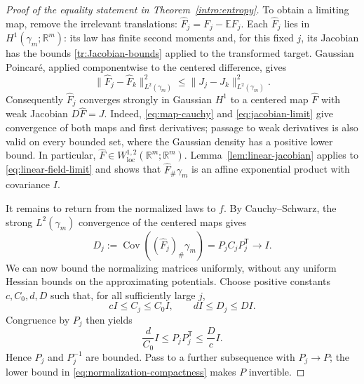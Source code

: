 \documentclass[11pt]{article}
\theoremstyle{definition}
\theoremstyle{remark}
\numberwithin{equation}{section}
\begin{document}
\begin{proof}[Proof of the equality statement in Theorem~\ref{intro:entropy}]
To obtain a limiting map, remove the irrelevant translations:
$\widehat F_j=F_j-\mathbb E F_j$.  Each $\widehat F_j$ lies in
$H^1(\gamma_m;\mathbb R^m)$: its law has finite second moments and, for this
fixed $j$, its Jacobian has the bounds \eqref{tr:Jacobian-bounds}
applied to the transformed target.  Gaussian Poincar\'e, applied
componentwise to the centered difference, gives
\begin{equation}\label{eq:map-cauchy}
  \lVert \widehat F_j-\widehat F_k\rVert_{L^2(\gamma_m)}^2
    \le \lVert J_j-J_k\rVert_{L^2(\gamma_m)}^2.
\end{equation}
Consequently $\widehat F_j$ converges strongly in Gaussian $H^1$ to a
centered map $\widehat F$ with weak Jacobian $D\widehat F=J$.
Indeed, \eqref{eq:map-cauchy} and \eqref{eq:jacobian-limit} give
convergence of both maps and first derivatives; passage to weak
derivatives is also valid on every bounded set, where the Gaussian
density has a positive lower bound.  In particular,
$\widehat F\in W^{1,2}_{\mathrm{loc}}(\mathbb R^m;\mathbb R^m)$.
Lemma~\ref{lem:linear-jacobian} applies to \eqref{eq:linear-field-limit}
and shows that $\widehat F_\#\gamma_m$ is an affine exponential product
with covariance $I$.

It remains to return from the normalized laws to $f$.
By Cauchy--Schwarz, the strong $L^2(\gamma_m)$ convergence of the
centered maps gives
\begin{equation}\label{eq:normalized-covariance-limit}
  D_j:=\operatorname{Cov}((\widehat F_j)_\#\gamma_m)
      =P_jC_jP_j^{\mathsf T}\longrightarrow I.
\end{equation}
We can now bound the normalizing matrices uniformly, without any
uniform Hessian bounds on the approximating potentials.
Choose positive constants $c,C_0,d,D$ such that, for all sufficiently
large $j$,
\[
  cI\le C_j\le C_0I,\qquad dI\le D_j\le DI.
\]
Congruence by $P_j$ then yields
\begin{equation}\label{eq:normalization-compactness}
  \frac d{C_0}I\le P_jP_j^{\mathsf T}\le\frac Dc I.
\end{equation}
Hence $P_j$ and $P_j^{-1}$ are bounded.  Pass to a further subsequence
with $P_j\to P$; the lower bound in
\eqref{eq:normalization-compactness} makes $P$ invertible.


\end{proof}
\end{document}
